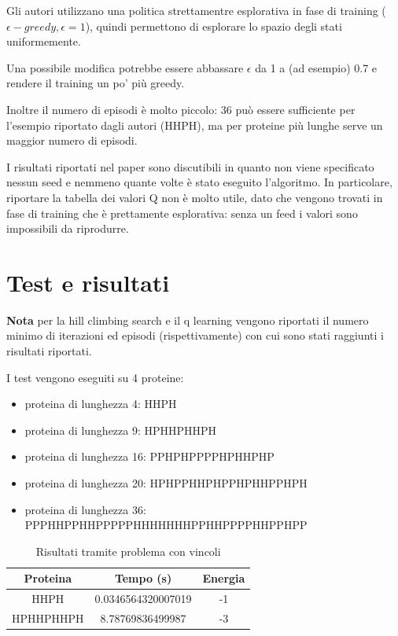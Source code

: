 \documentclass[conference]{IEEEtran}
\begin{document}
Gli autori utilizzano una politica strettamentre esplorativa in fase di training ($\epsilon-greedy, \epsilon = 1$), quindi permettono di esplorare lo spazio degli stati uniformemente.

Una possibile modifica potrebbe essere abbassare $\epsilon$ da 1 a (ad esempio) 0.7 e rendere il training un po' più greedy.

Inoltre il numero di episodi è molto piccolo: 36 può essere sufficiente per l'esempio riportato dagli autori (HHPH), ma per proteine più lunghe serve un maggior numero di episodi.

I risultati riportati nel paper sono discutibili in quanto non viene specificato nessun seed e nemmeno quante volte è stato eseguito l'algoritmo. In particolare, riportare la tabella dei valori Q non è molto utile, dato che vengono trovati in fase di training che è prettamente esplorativa: senza un feed i valori sono impossibili da riprodurre.

\section{Test e risultati}

\textbf{Nota} per la hill climbing search  e il q learning vengono riportati il numero minimo di iterazioni ed episodi (rispettivamente) con cui sono stati raggiunti i risultati riportati.

I test vengono eseguiti su 4 proteine:

\begin{itemize}
 \item proteina di lunghezza 4: HHPH
 \item proteina di lunghezza 9: HPHHPHHPH
 \item proteina di lunghezza 16: PPHPHPPPPHPHHPHP
 \item proteina di lunghezza 20: HPHPPHHPHPPHPHHPPHPH
 \item proteina di lunghezza 36: PPPHHPPHHPPPPPHHHHHHHPPHHPPPPHHPPHPP
\end{itemize}

\begin{table}[h]
\begin{center}
\begin{tabular}{|c|c|c|}
\hline
\textbf{Proteina} & \textbf{Tempo (s)} & \textbf{Energia} \\ \hline
HHPH & 0.0346564320007019 & -1 \\ \hline
HPHHPHHPH & 8.78769836499987 & -3 \\ \hline
\end{tabular}
\end{center}
\caption{Risultati tramite problema con vincoli}
\end{table}
\end{document}
